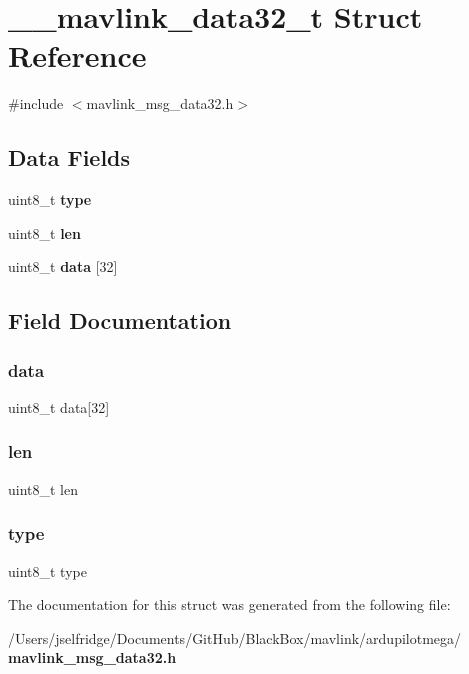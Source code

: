 \section{\+\_\+\+\_\+mavlink\+\_\+data32\+\_\+t Struct Reference}
\label{struct____mavlink__data32__t}


{\ttfamily \#include $<$mavlink\+\_\+msg\+\_\+data32.\+h$>$}

\subsection*{Data Fields}
\begin{DoxyCompactItemize}
\item 
uint8\+\_\+t \textbf{ type}
\item 
uint8\+\_\+t \textbf{ len}
\item 
uint8\+\_\+t \textbf{ data} [32]
\end{DoxyCompactItemize}


\subsection{Field Documentation}
\mbox{\label{struct____mavlink__data32__t_a6460a21fbea84550b8bf9c7ce257e4ed}} 
\subsubsection{data}
{\footnotesize\ttfamily uint8\+\_\+t data[32]}

\mbox{\label{struct____mavlink__data32__t_a5723e60ffd628510c699eddbce90be23}} 
\subsubsection{len}
{\footnotesize\ttfamily uint8\+\_\+t len}

\mbox{\label{struct____mavlink__data32__t_a1d127017fb298b889f4ba24752d08b8e}} 
\subsubsection{type}
{\footnotesize\ttfamily uint8\+\_\+t type}



The documentation for this struct was generated from the following file\+:\begin{DoxyCompactItemize}
\item 
/\+Users/jselfridge/\+Documents/\+Git\+Hub/\+Black\+Box/mavlink/ardupilotmega/\textbf{ mavlink\+\_\+msg\+\_\+data32.\+h}\end{DoxyCompactItemize}
